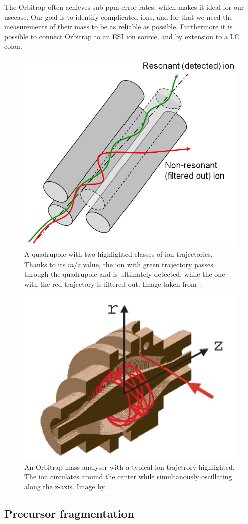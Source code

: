\begin{description}
    The Orbitrap often achieves sub-ppm error rates, which makes it ideal for our usecase. Our goal is to identify complicated ions, and for that we need the measurements of their mass to be as reliable as possible. Furthermore it is possible to connect Orbitrap to an ESI ion source, and by extension to a LC colon.
\end{description}

\begin{figure}
  \centering
  \includegraphics[width=.4\linewidth]{img/quadrupole.png}
  \caption{A quadrupole with two highlighted classes of ion trajectories. Thanks to its \(m/z\) value, the ion with green trajectory passes through the quadrupole and is ultimately detected, while the one with the red trajectory is filtered out. Image taken from~\citet{2021Mass}.}\label{fig:quadrupole}
\end{figure}

\begin{figure}
  \centering
  \includegraphics[width=.5\linewidth]{img/orbitrap.png}
  \caption{An Orbitrap mass analyser with a typical ion trajetrory highlighted. The ion circulates around the center while simultanously oscillating along the z-axis. Image by~\citet{hu2005orbitrap}.}\label{fig:orbitrap}
\end{figure}

\subsection{Precursor fragmentation}\label{sec:fragmentation}

